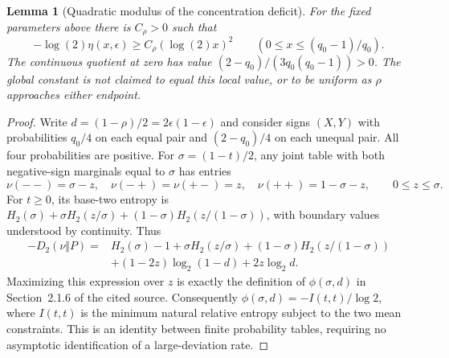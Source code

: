 \documentclass[11pt]{article}
\newtheorem{lemma}[theorem]{Lemma}
\begin{document}
\begin{lemma}[Quadratic modulus of the concentration deficit]
\label{lem:327-modulus}
For the fixed parameters above there is $C_\rho>0$ such that
\[
 -\log(2)\eta(x,\epsilon)\geq C_\rho(\log(2)x)^2
 \qquad (0\leq x\leq(q_0-1)/q_0).
\]
The continuous quotient at zero has value
$(2-q_0)/(3q_0(q_0-1))>0$. The global constant is not claimed to equal
this local value, or to be uniform as $\rho$ approaches either endpoint.
\end{lemma}
\begin{proof}
Write $d=(1-\rho)/2=2\epsilon(1-\epsilon)$ and consider signs $(X,Y)$
with probabilities $q_0/4$ on each equal pair and $(2-q_0)/4$ on each
unequal pair. All four probabilities are positive. For
$\sigma=(1-t)/2$, any joint table with both negative-sign marginals
equal to $\sigma$ has entries
\[
 \nu(--)=\sigma-z,\quad \nu(-+)=\nu(+-)=z,\quad
 \nu(++)=1-\sigma-z,\qquad 0\leq z\leq\sigma.
\]
For $t\geq0$, its base-two entropy is
$H_2(\sigma)+\sigma H_2(z/\sigma)+(1-\sigma)H_2(z/(1-\sigma))$,
with boundary values understood by continuity. Thus
\begin{align*}
 -D_2(\nu\Vert P)={}&H_2(\sigma)-1
   +\sigma H_2(z/\sigma)+(1-\sigma)H_2(z/(1-\sigma))\\
 &+(1-2z)\log_2(1-d)+2z\log_2d.
\end{align*}
Maximizing this expression over $z$ is exactly the definition of
$\phi(\sigma,d)$ in Section~2.1.6 of the cited source. Consequently
$\phi(\sigma,d)=-I(t,t)/\log2$, where $I(t,t)$ is the minimum natural
relative entropy subject to the two mean constraints. This is an identity
between finite probability tables, requiring no asymptotic identification
of a large-deviation rate.


\end{proof}
\end{document}
